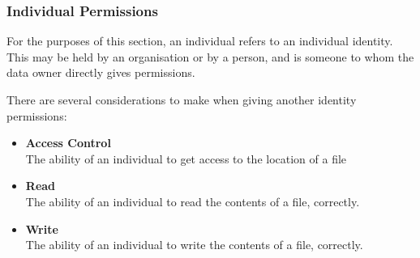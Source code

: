 \subsubsection{Individual Permissions}

For the purposes of this section, an individual refers to an individual identity. This may be held by an organisation or by a person, and is someone to whom the data owner directly gives permissions.

There are several considerations to make when giving another identity permissions:

\begin{itemize}
  \item 
  	\textbf{Access Control} \\
    The ability of an individual to get access to the location of a file
  \item
  	\textbf{Read} \\
    The ability of an individual to read the contents of a file, correctly.
  \item
    \textbf{Write} \\
    The ability of an individual to write the contents of a file, correctly.
\end{itemize}